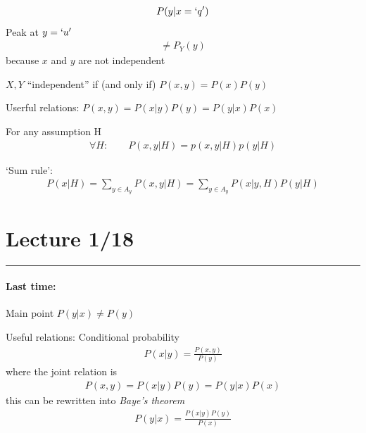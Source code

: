 \documentclass[../main.tex]{subfiles}
\begin{document}
\begin{align*}
    P(y | x = `q') 
\end{align*}
Peak at $y = `u'$
\begin{align*}
    \neq P_Y(y)
\end{align*}
because $x$ and $y$ are not independent

$X,Y$ ``independent'' if (and only if) $P(x,y) = P(x)P(y)$

Userful relations: $P(x, y) = P(x | y) P(y) = P(y | x) P(x)$

For any assumption H
\begin{align*}
    \forall H : \qquad P(x,y | H) = p(x, y | H) p(y | H)
\end{align*}

`Sum rule':
\begin{align*}
    P(x | H) = \sum_{y \in A_y} P(x,y | H) = \sum_{y \in A_y} P(x | y, H) P(y | H)
\end{align*}

\newpage
\section{Lecture 1/18}
\hrule \vspace{10px}

\paragraph{Last time:} Main point $P(y|x) \neq P(y)$

Useful relations: Conditional probability
\begin{align*}
    P(x|y) = \frac{P(x,y)}{P(y)}
\end{align*}
where the joint relation is 
\begin{align*}
    P(x,y) = P(x|y) P(y) = P(y|x) P(x)
\end{align*}
this can be rewritten into \emph{Baye's theorem}
\begin{align*}
    P(y|x) = \frac{P(x|y) P(y)}{P(x)}
\end{align*}
\end{document}
